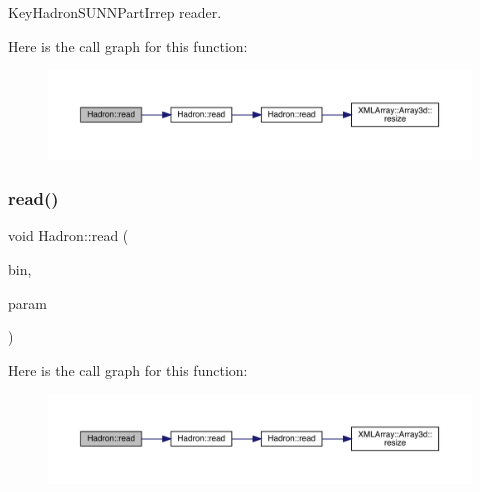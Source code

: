 Key\+Hadron\+S\+U\+N\+N\+Part\+Irrep reader. 

Here is the call graph for this function\+:\nopagebreak
\begin{figure}[H]
\begin{center}
\leavevmode
\includegraphics[width=350pt]{d1/daf/namespaceHadron_a4cc74936761dd0dad429189f523b1432_cgraph}
\end{center}
\end{figure}
\mbox{\label{namespaceHadron_a7f12085b340a6e0bfb52b3d920cfeb1e}} 
\subsubsection{\texorpdfstring{read()}{read()}\hspace{0.1cm}{\footnotesize\ttfamily [11/94]}}
{\footnotesize\ttfamily void Hadron\+::read (\begin{DoxyParamCaption}\item[{\mbox{\hyperlink{classADATIO_1_1BinaryReader}{Binary\+Reader}} \&}]{bin,  }\item[{\mbox{\hyperlink{structHadron_1_1HadronNptType__t}{Hadron\+Npt\+Type\+\_\+t}} \&}]{param }\end{DoxyParamCaption})}

Here is the call graph for this function\+:\nopagebreak
\begin{figure}[H]
\begin{center}
\leavevmode
\includegraphics[width=350pt]{d1/daf/namespaceHadron_a7f12085b340a6e0bfb52b3d920cfeb1e_cgraph}
\end{center}
\end{figure}
\mbox{\label{namespaceHadron_aaef0a2bed7d8dd73e0611d46f68b4ee6}} 
